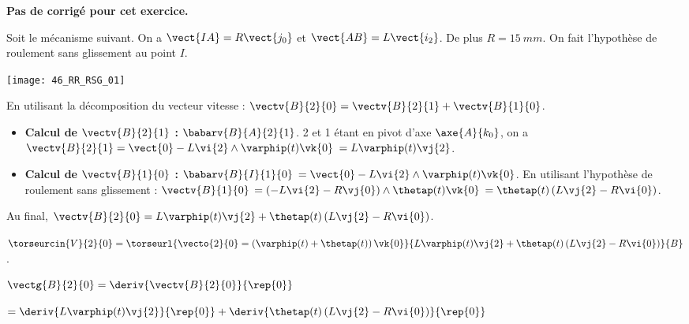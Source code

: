 \normalfalse \difficiletrue \tdifficilefalse
\correctiontrue


\setcounter{numques}{0}
\ifcorrection
\else
\textbf{Pas de corrigé pour cet exercice.}
\fi

\ifprof
\else
Soit le mécanisme suivant. On a $\vect{IA}=R\vect{j_0}$ et $\vect{AB}=L\vect{i_2}$. De plus $R=\SI{15}{mm}$. On fait l'hypothèse de roulement sans glissement au point $I$.
\begin{center}
\texttt{[image: 46\_RR\_RSG\_01]}
\end{center}
\fi


\ifprof
En utilisant la décomposition du vecteur vitesse : 
$\vectv{B}{2}{0} = \vectv{B}{2}{1} +  \vectv{B}{1}{0}$.

\begin{itemize}
\item \textbf{Calcul de $ \vectv{B}{2}{1}$ :}  $\babarv{B}{A}{2}{1}$. 2 et 1 étant en pivot d'axe $\axe{A}{k_0}$, on a $\vectv{B}{2}{1}=\vect{0}-L\vi{2}\wedge \varphip(t)\vk{0}$
$=L\varphip(t)\vj{2}$.
\item \textbf{Calcul de $ \vectv{B}{1}{0}$ :}  $\babarv{B}{I}{1}{0}$ 
$=\vect{0}-L\vi{2}\wedge \varphip(t)\vk{0}$. En utilisant l'hypothèse de roulement sans glissement : $ \vectv{B}{1}{0}$  $=\left(-L\vi{2}-R\vj{0}\right)\wedge \thetap(t)\vk{0}$  $=\thetap(t)\left(L\vj{2}-R\vi{0}\right)$.
\end{itemize}

Au final, $\vectv{B}{2}{0} = L\varphip(t)\vj{2} +\thetap(t)\left(L\vj{2}-R\vi{0}\right) $.


\else
\fi

\ifprof
 $\torseurcin{V}{2}{0} = \torseurl{\vecto{2}{0}=\left( \varphip(t)+\thetap(t) \right) \vk{0} }{ L\varphip(t)\vj{2} +\thetap(t)\left(L\vj{2}-R\vi{0}\right)}{B}$.
 

\else
\fi


\ifprof
$\vectg{B}{2}{0} = \deriv{\vectv{B}{2}{0}}{\rep{0}}$

$ = \deriv{L\varphip(t)\vj{2}}{\rep{0}} + \deriv{\thetap(t)\left(L\vj{2}-R\vi{0}\right)}{\rep{0}}$

